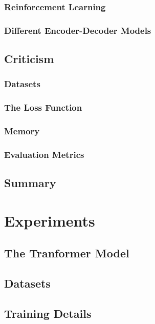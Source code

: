 \documentclass[12pt]{article}
\begin{document}
\subsubsection{Reinforcement Learning} \label{sssec:RL}

\subsubsection{Different Encoder-Decoder Models} \label{sssec:diffencdec}

\subsection{Criticism} \label{ssec:problems}
\subsubsection{Datasets}
\subsubsection{The Loss Function}
\subsubsection{Memory}
\subsubsection{Evaluation Metrics} \label{sssec:metrics}

\subsection{Summary} \label{ssec:summary}
    

\newpage\section{Experiments} \label{sec:experiments}
\subsection{The Tranformer Model} \label{ssec:41}
\subsection{Datasets} \label{ssec:42}
\subsection{Training Details} \label{ssec:43}
\end{document}
